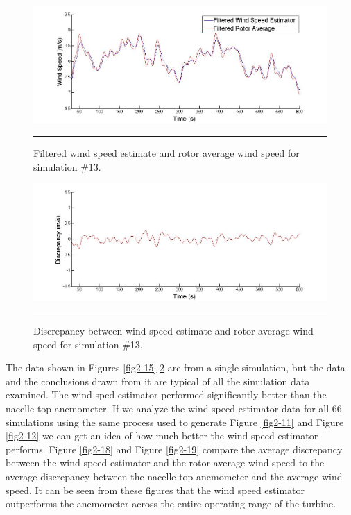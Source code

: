 \begin{figure}[htbp]
	\centering
		\includegraphics[trim = {3cm 0 2.5cm 0}, clip, width = \linewidth]{Figures/ch2Figures/fig2-16.jpg}
		\rule{35em}{0.5pt}
	\caption{Filtered wind speed estimate and rotor average wind speed for simulation \#13.}
	\label{fig2-16}
\end{figure}



\begin{figure}[htbp]
	\centering
		\includegraphics[trim = {3cm 0 2.5cm 0}, clip, width = \linewidth]{Figures/ch2Figures/fig2-17.jpg}
		\rule{35em}{0.5pt}
	\caption{Discrepancy between wind speed estimate and rotor average wind speed for simulation \#13.}
	\label{fig2-17}
\end{figure}

The data shown in Figures \ref{fig2-15}-\ref{fig2-17} are from a single simulation, but the data and the conclusions drawn from it are typical of all the simulation data examined. The wind sped estimator performed significantly better than the nacelle top anemometer. If we analyze the wind speed estimator data for all 66 simulations using the same process used to generate Figure \ref{fig2-11} and Figure \ref{fig2-12} we can get an idea of how much better the wind speed estimator performs. Figure \ref{fig2-18} and Figure \ref{fig2-19} compare the average discrepancy between the wind speed estimator and the rotor average wind speed to the average discrepancy between the nacelle top anemometer and the average wind speed. It can be seen from these figures that the wind speed estimator outperforms the anemometer across the entire operating range of the turbine. 


